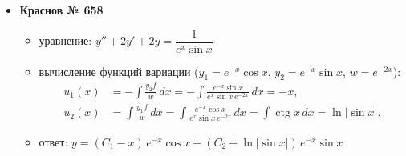 \documentclass[11pt,a4paper]{article}
\newcommand{\tgn}{\operatorname{tg}}
\newcommand{\ctgn}{\operatorname{ctg}}
\begin{document}
\begin{itemize}[topsep=2pt]
\begin{itemize}
    \item уравнение: $y'' + y = \dfrac{2}{\cos^3 x}$
    \item вычисление функций вариации ($y_1=\cos x$, $y_2=\sin x$, $w=1$):
    \[
      \begin{aligned}
        u_1(x) &= -\int\frac{y_2f}{w}\,dx
          = -\int\frac{2\sin x}{\cos^3x}\,dx = -\frac{1}{\cos^2x},\\
        u_2(x) &= \int\frac{y_1f}{w}\,dx
          = 2\int\frac{dx}{\cos^2x} = 2\tgn x.
      \end{aligned}
    \]
    \item ответ: $y = C_1\cos x + C_2\sin x - \dfrac{\cos 2x}{\cos x}$
  \end{itemize}
  \item \textbf{Краснов № 658}
  \begin{itemize}
    \item уравнение: $y'' + 2y' + 2y = \dfrac{1}{e^{x}\sin x}$
    \item вычисление функций вариации ($y_1=e^{-x}\cos x$, $y_2=e^{-x}\sin x$, $w=e^{-2x}$):
    \[
      \begin{aligned}
        u_1(x) &= -\int\frac{y_2f}{w}\,dx
          = -\int\frac{e^{-x}\sin x}{e^x\sin x\,e^{-2x}}\,dx = -x,\\
        u_2(x) &= \int\frac{y_1f}{w}\,dx
          = \int\frac{e^{-x}\cos x}{e^x\sin x\,e^{-2x}}\,dx
          = \int\ctgn x\,dx = \ln|\sin x|.
      \end{aligned}
    \]
    \item ответ: $y = (C_1 - x)\, e^{-x}\cos x + (C_2 + \ln|\sin x|)\, e^{-x}\sin x$
  \end{itemize}
\end{itemize}

\end{document}
